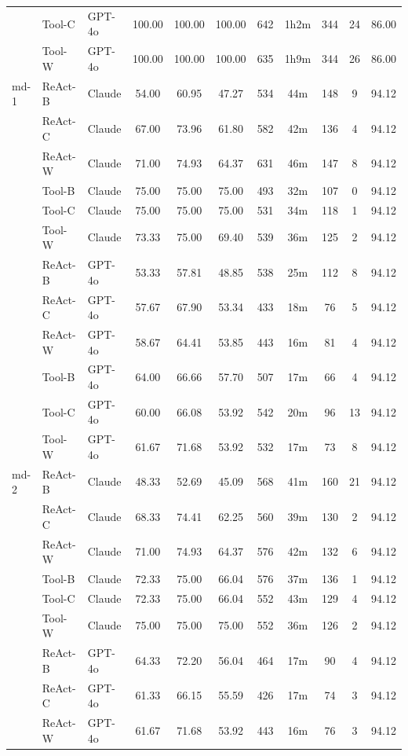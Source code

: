 \begin{longtable}{lllcccccccc}
 & Tool-C & GPT-4o & 100.00 & 100.00 & 100.00 & 642 & 1h2m & 344 & 24 & 86.00 \\
 & Tool-W & GPT-4o & 100.00 & 100.00 & 100.00 & 635 & 1h9m & 344 & 26 & 86.00 \\
md-1 & ReAct-B & Claude & 54.00 & 60.95 & 47.27 & 534 & 44m & 148 & 9 & 94.12 \\
 & ReAct-C & Claude & 67.00 & 73.96 & 61.80 & 582 & 42m & 136 & 4 & 94.12 \\
 & ReAct-W & Claude & 71.00 & 74.93 & 64.37 & 631 & 46m & 147 & 8 & 94.12 \\
 & Tool-B & Claude & 75.00 & 75.00 & 75.00 & 493 & 32m & 107 & 0 & 94.12 \\
 & Tool-C & Claude & 75.00 & 75.00 & 75.00 & 531 & 34m & 118 & 1 & 94.12 \\
 & Tool-W & Claude & 73.33 & 75.00 & 69.40 & 539 & 36m & 125 & 2 & 94.12 \\
 & ReAct-B & GPT-4o & 53.33 & 57.81 & 48.85 & 538 & 25m & 112 & 8 & 94.12 \\
 & ReAct-C & GPT-4o & 57.67 & 67.90 & 53.34 & 433 & 18m & 76 & 5 & 94.12 \\
 & ReAct-W & GPT-4o & 58.67 & 64.41 & 53.85 & 443 & 16m & 81 & 4 & 94.12 \\
 & Tool-B & GPT-4o & 64.00 & 66.66 & 57.70 & 507 & 17m & 66 & 4 & 94.12 \\
 & Tool-C & GPT-4o & 60.00 & 66.08 & 53.92 & 542 & 20m & 96 & 13 & 94.12 \\
 & Tool-W & GPT-4o & 61.67 & 71.68 & 53.92 & 532 & 17m & 73 & 8 & 94.12 \\
md-2 & ReAct-B & Claude & 48.33 & 52.69 & 45.09 & 568 & 41m & 160 & 21 & 94.12 \\
 & ReAct-C & Claude & 68.33 & 74.41 & 62.25 & 560 & 39m & 130 & 2 & 94.12 \\
 & ReAct-W & Claude & 71.00 & 74.93 & 64.37 & 576 & 42m & 132 & 6 & 94.12 \\
 & Tool-B & Claude & 72.33 & 75.00 & 66.04 & 576 & 37m & 136 & 1 & 94.12 \\
 & Tool-C & Claude & 72.33 & 75.00 & 66.04 & 552 & 43m & 129 & 4 & 94.12 \\
 & Tool-W & Claude & 75.00 & 75.00 & 75.00 & 552 & 36m & 126 & 2 & 94.12 \\
 & ReAct-B & GPT-4o & 64.33 & 72.20 & 56.04 & 464 & 17m & 90 & 4 & 94.12 \\
 & ReAct-C & GPT-4o & 61.33 & 66.15 & 55.59 & 426 & 17m & 74 & 3 & 94.12 \\
 & ReAct-W & GPT-4o & 61.67 & 71.68 & 53.92 & 443 & 16m & 76 & 3 & 94.12 \\

\end{longtable}
